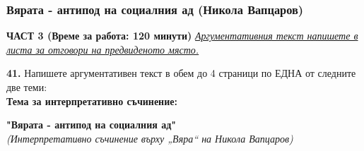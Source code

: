 \documentclass[12pt,a4paper]{article}
\begin{document}
\subsubsection{Вярата - антипод на социалния ад (Никола Вапцаров)}
\vspace{0.5cm}
\begin{center}
\textbf{ЧАСТ 3 (Време за работа: 120 минути)}
\vspace{0.2cm}
{\textit{\underline{Аргументативния текст напишете в листа за отговори на предвиденото място.}}}
\vspace{0.1cm}
\end{center}
\textbf{41.} Напишете аргументативен текст в обем до 4 страници по ЕДНА от следните две теми:
\\
\vspace{0.2cm}
\textbf{Тема за интерпретативно съчинение:}
\vspace{0.1cm}
\begin{center}
\textbf{"Вярата - антипод на социалния ад"}
\\
\textit{(Интерпретативно съчинение върху „Вяра“ на Никола Вапцаров)}
\end{center}
\end{document}
